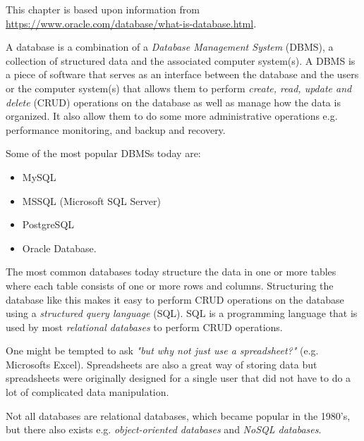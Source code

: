 This chapter is based upon information from \url{https://www.oracle.com/database/what-is-database.html}.

A database is a combination of a \textit{Database Management System} (DBMS), a collection of structured data and the associated computer system(s).
A DBMS is a piece of software that serves as an interface between the database and the users or the computer system(s) that allows them to perform \textit{create, read, update and delete} (CRUD) operations on the database as well as manage how the data is organized. It also allow them to do some more administrative operations e.g. performance monitoring, and backup and recovery.

Some of the most popular DBMSs today are: 
\begin{itemize}
        \item MySQL
        \item MSSQL (Microsoft SQL Server)
        \item PostgreSQL
        \item Oracle Database.
\end{itemize}

The most common databases today structure the data in one or more tables where each table consists of one or more rows and columns. Structuring the database like this makes it easy to perform CRUD operations on the database using a \textit{structured query language} (SQL). SQL is a programming language that is used by most \textit{relational databases} to perform CRUD operations.

One might be tempted to ask \textit{"but why not just use a spreadsheet?"} (e.g. Microsofts Excel). Spreadsheets are also a great way of storing data but spreadsheets were originally designed for a single user that did not have to do a lot of complicated data manipulation.

Not all databases are relational databases, which became popular in the 1980's, but there also exists e.g. \textit{object-oriented databases} and \textit{NoSQL databases}. 
